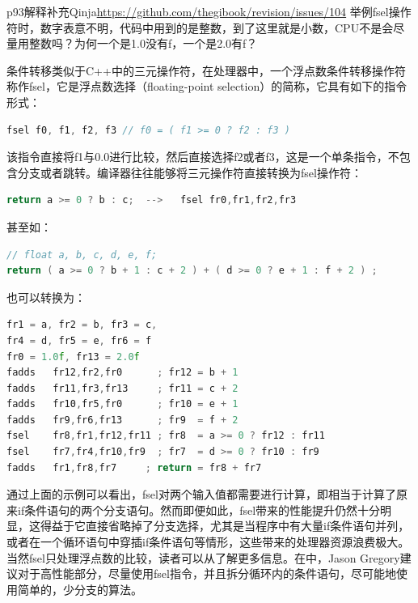 \begin{revision}{p93}{解释补充}{Qinja}{\url{https://github.com/thegibook/revision/issues/104}}
	举例fsel操作符时，数字表意不明，代码中用到的是整数，到了这里就是小数，CPU不是会尽量用整数吗？为何一个是1.0没有f，一个是2.0有f？
\end{revision}
条件转移类似于C++中的三元操作符，在处理器中，一个浮点数条件转移操作符称作fsel，它是浮点数选择（floating-point selection）的简称，它具有如下的指令形式：

\begin{lstlisting}[language=C++]
fsel f0, f1, f2, f3 // f0 = ( f1 >= 0 ? f2 : f3 )
\end{lstlisting}

该指令直接将f1与0.0进行比较，然后直接选择f2或者f3，这是一个单条指令，不包含分支或者跳转。编译器往往能够将三元操作符直接转换为fsel操作符：

\begin{lstlisting}[language=C++]
	return a >= 0 ? b : c;	-->   fsel fr0,fr1,fr2,fr3
\end{lstlisting}

甚至如：

\begin{lstlisting}[language=C++]
// float a, b, c, d, e, f;
return ( a >= 0 ? b + 1 : c + 2 ) + ( d >= 0 ? e + 1 : f + 2 ) ;
\end{lstlisting}
也可以转换为：

\begin{lstlisting}[language=C++]
fr1 = a, fr2 = b, fr3 = c,
fr4 = d, fr5 = e, fr6 = f
fr0 = 1.0f, fr13 = 2.0f
fadds   fr12,fr2,fr0      ; fr12 = b + 1
fadds   fr11,fr3,fr13     ; fr11 = c + 2
fadds   fr10,fr5,fr0      ; fr10 = e + 1
fadds   fr9,fr6,fr13      ; fr9  = f + 2
fsel    fr8,fr1,fr12,fr11 ; fr8  = a >= 0 ? fr12 : fr11
fsel    fr7,fr4,fr10,fr9  ; fr7  = d >= 0 ? fr10 : fr9
fadds   fr1,fr8,fr7     ; return = fr8 + fr7
\end{lstlisting}

通过上面的示例可以看出，fsel对两个输入值都需要进行计算，即相当于计算了原来if条件语句的两个分支语句。然而即便如此，fsel带来的性能提升仍然十分明显，这得益于它直接省略掉了分支选择，尤其是当程序中有大量if条件语句并列，或者在一个循环语句中穿插if条件语句等情形，这些带来的处理器资源浪费极大。当然fsel只处理浮点数的比较，读者可以从\cite{a:ThePowerPCCompilerWritersGuide}了解更多信息。在\cite{a:DoggedDetermination:TechnologyandProcessatNaughtyDogInc.}中，Jason Gregory建议对于高性能部分，尽量使用fsel指令，并且拆分循环内的条件语句，尽可能地使用简单的，少分支的算法。

